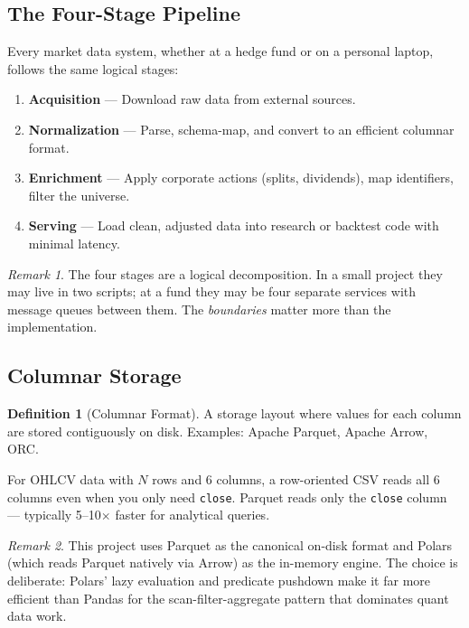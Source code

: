 \documentclass[a4paper, 11pt]{report}
\theoremstyle{definition}
\newtheorem{definition}{Definition}[chapter]
\theoremstyle{remark}
\newtheorem{remark}{Remark}[chapter]
\begin{document}
\subsection{The Four-Stage Pipeline}

Every market data system, whether at a hedge fund or on a personal laptop, follows
the same logical stages:

\begin{enumerate}
    \item \textbf{Acquisition} --- Download raw data from external sources.
    \item \textbf{Normalization} --- Parse, schema-map, and convert to an efficient
          columnar format.
    \item \textbf{Enrichment} --- Apply corporate actions (splits, dividends), map
          identifiers, filter the universe.
    \item \textbf{Serving} --- Load clean, adjusted data into research or backtest
          code with minimal latency.
\end{enumerate}

\begin{remark}
    The four stages are a logical decomposition.  In a small project they may
    live in two scripts; at a fund they may be four separate services with
    message queues between them.  The \emph{boundaries} matter more than the
    implementation.
\end{remark}

\subsection{Columnar Storage}

\begin{definition}[Columnar Format]
    A storage layout where values for each column are stored contiguously on disk.
    Examples: Apache Parquet, Apache Arrow, ORC\@.

    For OHLCV data with $N$ rows and 6 columns, a row-oriented CSV reads all 6
    columns even when you only need \texttt{close}.  Parquet reads only the
    \texttt{close} column --- typically 5--10$\times$ faster for analytical queries.
\end{definition}

\begin{remark}
    This project uses Parquet as the canonical on-disk format and Polars
    (which reads Parquet natively via Arrow) as the in-memory engine.
    The choice is deliberate: Polars' lazy evaluation and predicate pushdown
    make it far more efficient than Pandas for the scan-filter-aggregate pattern
    that dominates quant data work.
\end{remark}
\end{document}
